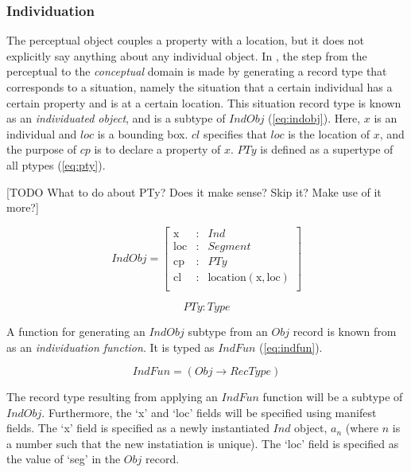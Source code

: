 \subsubsection{Individuation}

The perceptual object couples a property with a location, but it does not explicitly say anything about any individual object.
In \cite{lspc}, the step from the perceptual to the \textit{conceptual} domain is made by generating a record type that corresponds to a situation, namely the situation that a certain individual has a certain property and is at a certain location.
This situation record type is known as an \textit{individuated object}, and is a subtype of $IndObj$ (\autoref{eq:indobj}).
Here, $x$ is an individual and $loc$ is a bounding box.
$cl$ specifies that $loc$ is the location of $x$, and the purpose of $cp$ is to declare a property of $x$.
$PTy$ is defined as a supertype of all ptypes (\autoref{eq:pty}).

[TODO What to do about PTy? Does it make sense? Skip it? Make use of it more?]

\begin{equation}\label{eq:indobj}
IndObj = \left[\begin{array}{rcl}
\text{x} &:& Ind \\
\text{loc} &:& Segment \\
\text{cp} &:& PTy \\
\text{cl} &:& \text{location}(\text{x}, \text{loc}) \\
\end{array}\right]
\end{equation}

\begin{equation}\label{eq:pty}
PTy : Type
\end{equation}

A function for generating an $IndObj$ subtype from an $Obj$ record is known from \cite{lspc} as an \textit{individuation function}.
It is typed as $IndFun$ (\autoref{eq:indfun}).

\begin{equation}\label{eq:indfun}
IndFun = ( Obj \rightarrow RecType )
\end{equation}

The record type resulting from applying an $IndFun$ function will be a subtype of $IndObj$.
Furthermore, the `x' and `loc' fields will be specified using manifest fields.
The `x' field is specified as a newly instantiated $Ind$ object, $a_n$ (where $n$ is a number such that the new instatiation is unique).
The `loc' field is specified as the value of `seg' in the $Obj$ record.

